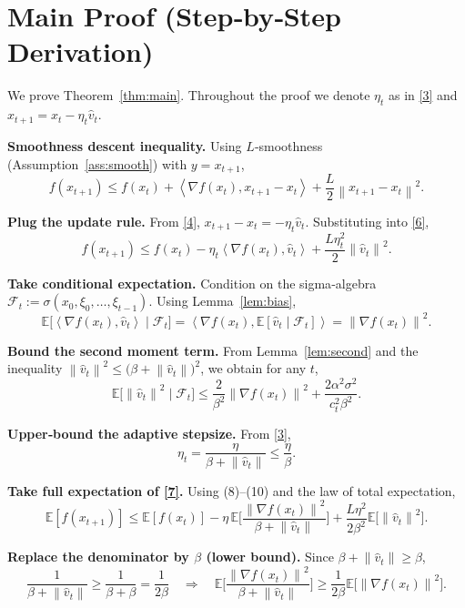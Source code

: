 \documentclass{article}
\newcommand{\EE}{\mathbb{E}}
\newcommand{\norm}[1]{\left\|#1\right\|}
\newcommand{\inner}[2]{\left\langle #1,#2\right\rangle}
\newcommand{\grad}{\nabla}
\begin{document}
\section*{Main Proof (Step‑by‑Step Derivation)}
We prove Theorem~\ref{thm:main}.  Throughout the proof we denote
$\eta_t$ as in \eqref{3} and $x_{t+1}=x_t-\eta_t\hat v_t$.

\begin{enumerate}[label={[\textbf{Step \arabic*.}]}, leftmargin=*]
\item \textbf{Smoothness descent inequality.}  
Using $L$‑smoothness (Assumption~\ref{ass:smooth}) with $y=x_{t+1}$,
\[
f(x_{t+1})\le f(x_t)+\inner{\grad f(x_t)}{x_{t+1}-x_t}
           +\frac{L}{2}\norm{x_{t+1}-x_t}^{2}.
\tag{6}
\]

\item \textbf{Plug the update rule.}  
From \eqref{4}, $x_{t+1}-x_t=-\eta_t\hat v_t$.  Substituting into \eqref{6},
\[
f(x_{t+1})\le f(x_t)-\eta_t\inner{\grad f(x_t)}{\hat v_t}
            +\frac{L\eta_t^{2}}{2}\norm{\hat v_t}^{2}.
\tag{7}
\]

\item \textbf{Take conditional expectation.}  
Condition on the sigma‑algebra $\mathcal{F}_t:=\sigma(x_0,\xi_0,\dots,\xi_{t-1})$.
Using Lemma~\ref{lem:bias},
\[
\EE\!\big[\inner{\grad f(x_t)}{\hat v_t}\mid\mathcal{F}_t\big]
   =\inner{\grad f(x_t)}{\EE[\hat v_t\mid\mathcal{F}_t]}
   =\norm{\grad f(x_t)}^{2}.
\tag{8}
\]

\item \textbf{Bound the second moment term.}  
From Lemma~\ref{lem:second} and the inequality $\norm{\hat v_t}^{2}\le
\big(\beta+\norm{\hat v_t}\big)^{2}$, we obtain for any $t$,
\[
\EE\!\big[\norm{\hat v_t}^{2}\mid\mathcal{F}_t\big]
   \le \frac{2}{\beta^{2}}\norm{\grad f(x_t)}^{2}
        +\frac{2\alpha^{2}\sigma^{2}}{c_t^{2}\beta^{2}} .
\tag{9}
\]

\item \textbf{Upper‑bound the adaptive stepsize.}  
From \eqref{3},
\[
\eta_t=\frac{\eta}{\beta+\norm{\hat v_t}}\le\frac{\eta}{\beta}.
\tag{10}
\]

\item \textbf{Take full expectation of \eqref{7}.}  
Using (8)–(10) and the law of total expectation,
\[
\EE[f(x_{t+1})]\le
\EE[f(x_t)]-\eta\,\EE\!\Big[\frac{\norm{\grad f(x_t)}^{2}}{\beta+\norm{\hat v_t}}\Big]
          +\frac{L\eta^{2}}{2\beta^{2}}\EE\!\Big[\norm{\hat v_t}^{2}\Big].
\tag{11}
\]

\item \textbf{Replace the denominator by $\beta$ (lower bound).}  
Since $\beta+\norm{\hat v_t}\ge\beta$,
\[
\frac{1}{\beta+\norm{\hat v_t}}\ge\frac{1}{\beta+\beta}= \frac{1}{2\beta}
\quad\Longrightarrow\quad
\EE\!\Big[\frac{\norm{\grad f(x_t)}^{2}}{\beta+\norm{\hat v_t}}\Big]
   \ge\frac{1}{2\beta}\EE\!\big[\norm{\grad f(x_t)}^{2}\big].
\tag{12}
\]


\end{enumerate}
\end{document}
